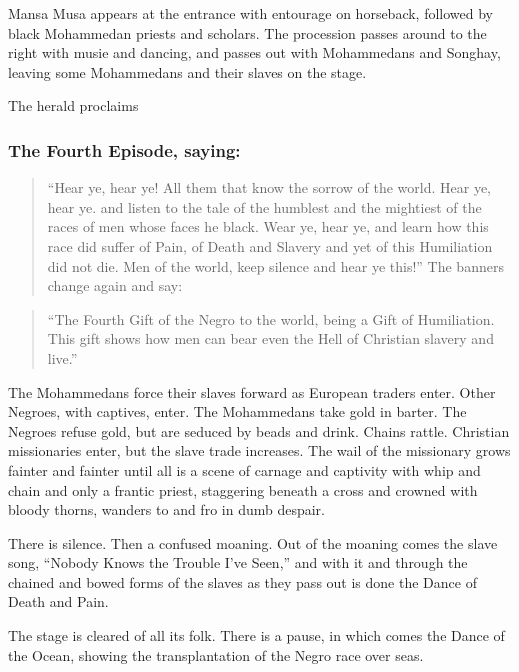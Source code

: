 \documentclass[letterpaper,10pt,english]{jupyterBook}
\begin{document}
\sphinxAtStartPar
Mansa Musa appears at the entrance with entourage on horseback, followed by black Mohammedan priests and scholars. The procession passes around to the right with musie and dancing, and passes out with Mohammedans and Songhay, leaving some Mohammedans and their slaves on the stage.

\sphinxAtStartPar
The herald proclaims


\subsubsection{The Fourth Episode, saying:}
\label{\detokenize{Volumes/06/07/national_emancipation_exposition:the-fourth-episode-saying}}\begin{quote}

\sphinxAtStartPar
“Hear ye, hear ye! All them that know the sorrow of the world. Hear ye, hear ye. and listen to the tale of the humblest and the mightiest of the races of men whose faces he black. Wear ye, hear ye, and learn how this race did suffer of Pain, of Death and Slavery and yet of this Humiliation did not die. Men of the world, keep silence and hear ye this!” The banners change again and say:
\end{quote}
\begin{quote}

\sphinxAtStartPar
“The Fourth Gift of the Negro to the world, being a Gift of Humiliation. This gift shows how men can bear even the Hell of Christian slavery and live.”
\end{quote}

\sphinxAtStartPar
The Mohammedans force their slaves forward as European traders enter. Other Negroes, with captives, enter. The Mohammedans take gold in barter. The Negroes refuse gold, but are seduced by beads and drink. Chains rattle. Christian missionaries enter, but the slave trade increases. The wail of the missionary grows fainter and fainter until all is a scene of carnage and captivity with whip and chain and only a frantic priest, staggering beneath a cross and crowned with bloody thorns, wanders to and fro in dumb despair.

\sphinxAtStartPar
There is silence. Then a confused moaning. Out of the moaning comes the slave song, “Nobody Knows the Trouble I’ve Seen,” and with it and through the chained and bowed forms of the slaves as they pass out is done the Dance of Death and Pain.

\sphinxAtStartPar
The stage is cleared of all its folk. There is a pause, in which comes the Dance of the Ocean, showing the transplantation of the Negro race over seas.
\end{document}
